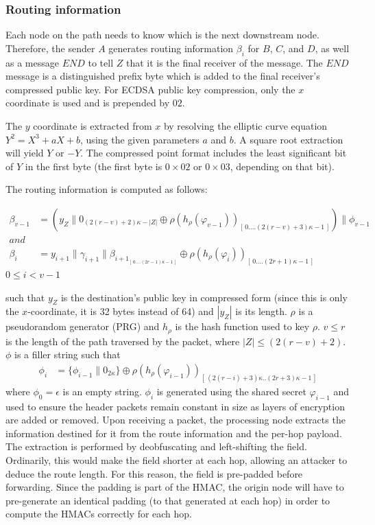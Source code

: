 \subsubsection{Routing information}
Each node on the path needs to know which is the next downstream node. Therefore, the sender $A$ generates routing information $\beta_i$ for $B$, $C$, and $D$, as well as a message $END$ to tell $Z$ that it is the final receiver of the message.  The $END$ message is a distinguished prefix byte which is added to the final receiver's compressed public key. For ECDSA public key compression, only the $x$ coordinate is used and is prepended by $02$. 

The $y$ coordinate is extracted from $x$ by resolving the elliptic curve equation $Y^2=X^3+aX+b$, using the given parameters $a$ and $b$. A square root extraction will yield $Y$ or $-Y$. The compressed point format includes the least significant bit of $Y$ in the first byte (the first byte is $0\times02$ or $0\times03$, depending on that bit).

The routing information is computed as follows:

\begin{align}  
    \beta_{v-1} &=(y_Z\|0_{(2(r-v)+2)\kappa-|Z|}\oplus \rho(h_{\rho}(\varphi_{v-1}))_{[ \,0....(2(r-v)+3)\kappa-1\,]})\|\phi_{v-1}\\
    and &\nonumber \\
    \beta_i &=y_{i+1}\|\gamma_{i+1}\|\beta_{{i+1}_{[ \,0....(2r-1)\kappa-1\,] }}\oplus \rho(h_{\rho}(\varphi_{i}))_{[ \,0....(2r+1)\kappa-1\,]} 
    \label{eq:2}
\end{align}
$0\le i < v-1$

such that $y_Z$ is the destination's public key in compressed form (since this is only the $x$-coordinate, it is 32 bytes instead of 64) and $|y_Z|$ is its length. $\rho$ is a pseudorandom generator (PRG) and $h_{\rho}$ is the hash function used to key $\rho$.
$v\leq r$ is the length of the path traversed by the packet, where $|Z| \leq (2(r - v) + 2)$. $\phi$ is a filler string such that
\begin{align}  
    \phi_i&=\{ \phi_{i-1}\|0_{2\kappa}\}\oplus \rho(h_{\rho}(\varphi_{i-1}))_{[ \,(2(r-i)+3)\kappa..(2r+3)\kappa-1\,]}
\end{align}
where $\phi_0=\epsilon$ is an empty string. $\phi_i$ is generated using the shared secret $\varphi_{i-1}$ and used to ensure the header packets remain constant in size as layers of encryption are added or removed. Upon receiving a packet, the processing node extracts the information destined for it from the route information and the per-hop payload. The extraction is performed by deobfuscating and left-shifting the field. Ordinarily, this would make the field shorter at each hop, allowing an attacker to deduce the route length. For this reason, the field is pre-padded before forwarding. Since the padding is part of the HMAC, the origin node will have to pre-generate an identical padding (to that generated at each hop) in order to compute the HMACs correctly for each hop.
    
